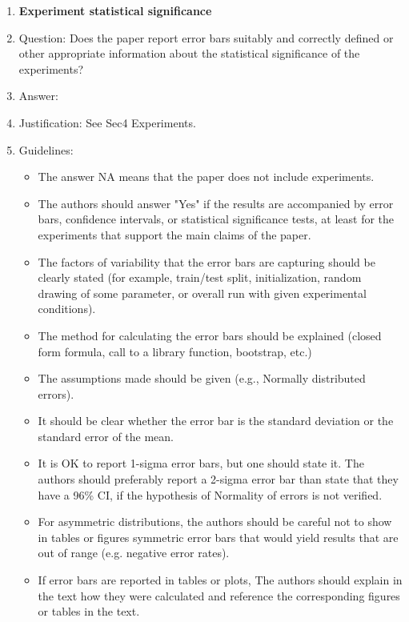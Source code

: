 \documentclass{article}
\begin{document}
\begin{enumerate}
\item {\bf Experiment statistical significance}
    \item[] Question: Does the paper report error bars suitably and correctly defined or other appropriate information about the statistical significance of the experiments?
    \item[] Answer: \answerYes{} %
    \item[] Justification: See Sec4 Experiments.
    \item[] Guidelines:
    \begin{itemize}
        \item The answer NA means that the paper does not include experiments.
        \item The authors should answer "Yes" if the results are accompanied by error bars, confidence intervals, or statistical significance tests, at least for the experiments that support the main claims of the paper.
        \item The factors of variability that the error bars are capturing should be clearly stated (for example, train/test split, initialization, random drawing of some parameter, or overall run with given experimental conditions).
        \item The method for calculating the error bars should be explained (closed form formula, call to a library function, bootstrap, etc.)
        \item The assumptions made should be given (e.g., Normally distributed errors).
        \item It should be clear whether the error bar is the standard deviation or the standard error of the mean.
        \item It is OK to report 1-sigma error bars, but one should state it. The authors should preferably report a 2-sigma error bar than state that they have a 96\% CI, if the hypothesis of Normality of errors is not verified.
        \item For asymmetric distributions, the authors should be careful not to show in tables or figures symmetric error bars that would yield results that are out of range (e.g. negative error rates).
        \item If error bars are reported in tables or plots, The authors should explain in the text how they were calculated and reference the corresponding figures or tables in the text.
    \end{itemize}


\end{enumerate}
\end{document}
